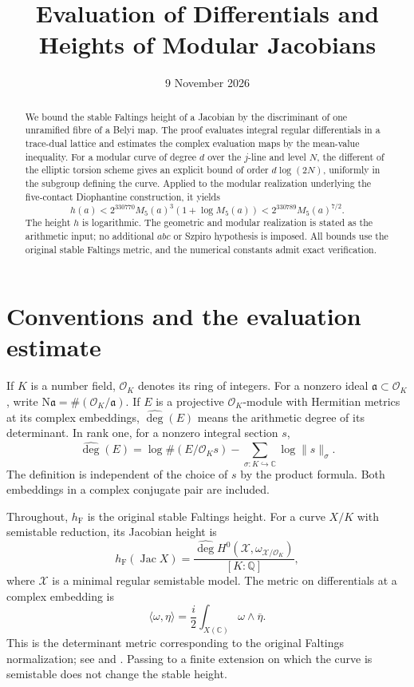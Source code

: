 \documentclass[11pt,a4paper]{article}
\title{Evaluation of Differentials and Heights of Modular Jacobians}
\author{}
\date{9 November 2026}
\theoremstyle{definition}
\newcommand{\Q}{\mathbb Q}
\newcommand{\C}{\mathbb C}
\newcommand{\hF}{h_{\mathrm F}}
\newcommand{\OK}{\mathcal O_K}
\newcommand{\Jac}{\operatorname{Jac}}
\newcommand{\Ardeg}{\widehat{\deg}}
\begin{document}
\maketitle
\begin{abstract}
We bound the stable Faltings height of a Jacobian by the discriminant
of one unramified fibre of a Belyi map. The proof evaluates integral
regular differentials in a trace-dual lattice and estimates the
complex evaluation maps by the mean-value inequality. For a modular
curve of degree $d$ over the $j$-line and level $N$, the different of
the elliptic torsion scheme gives an explicit bound of order
$d\log(2N)$, uniformly in the subgroup defining the curve.
Applied to the modular realization
underlying the five-contact Diophantine construction, it yields
\[
 h(a)<2^{330770}M_5(a)^3(1+\log M_5(a))
       <2^{330789}M_5(a)^{7/2}.
\]
The height $h$ is logarithmic. The geometric and modular realization
is stated as the arithmetic input; no additional $abc$ or Szpiro
hypothesis is imposed. All bounds use the original stable Faltings
metric, and the numerical constants admit exact verification.
\end{abstract}

\section{Conventions and the evaluation estimate}

If $K$ is a number field, $\OK$ denotes its ring of integers.
For a nonzero ideal $\mathfrak a\subset\OK$, write
$\mathrm N\mathfrak a=\#(\OK/\mathfrak a)$.
If $E$ is a projective $\OK$-module with Hermitian metrics at
its complex embeddings, $\Ardeg(E)$ means the arithmetic degree
of its determinant. In rank one, for a nonzero integral section $s$,
\[
 \Ardeg(E)=\log\#(E/\OK s)
                  -\sum_{\sigma:K\hookrightarrow\C}\log\|s\|_\sigma.
\]
The definition is independent of the choice of $s$ by the product
formula. Both embeddings in a complex conjugate pair are included.

Throughout, $\hF$ is the original stable Faltings height.
For a curve $X/K$ with semistable reduction, its Jacobian height is
\begin{equation}\label{eq:height-convention}
 \hF(\Jac X)=\frac{\Ardeg H^0(\mathcal X,
                                  \omega_{\mathcal X/\OK})}{[K:\Q]},
\end{equation}
where $\mathcal X$ is a minimal regular semistable model. The metric
on differentials at a complex embedding is
\[
 \langle\omega,\eta\rangle
       =\frac i2\int_{X(\C)}\omega\wedge\overline\eta.
\]
This is the determinant metric corresponding to the original Faltings
normalization; see \cite[Sections~2.1 and~2.3]{Javanpeykar} and
\cite[Section~2.1]{vonKaenel}. Passing to a finite extension on which
the curve is semistable does not change the stable height.
\end{document}
